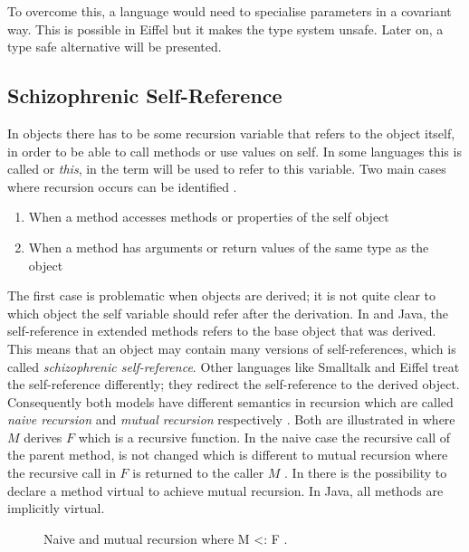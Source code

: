 To overcome this, a language would need to specialise parameters in a
covariant way. This is possible in Eiffel but it makes the type system
unsafe. Later on, a type safe alternative will be presented.

\subsection{Schizophrenic Self-Reference}
\label{sec:schizoReferences}
In objects there has to be some recursion variable that refers to the
object itself, in order to be able to call methods or use values on
self. In some languages this is called \self or \emph{this}, in \ooplss
the term \self will be used to refer to this variable. Two main cases
where recursion occurs can be identified \cite{simons_theory_2003-2}.

\begin{enumerate}
	\item When a method accesses methods or properties of the self object
	\item When a method has arguments or return values of the same type as the object
\end{enumerate}

The first case is problematic when objects are derived; it is not
quite clear to which object the self variable should refer after
the derivation. In \cpp and Java, the self-reference in extended
methods refers to the base object that was derived. This means that
an object may contain many versions of self-references, which is
called \emph{schizophrenic self-reference}. Other languages like
Smalltalk and Eiffel treat the self-reference differently; they
redirect the self-reference to the derived object. Consequently
both models have different semantics in recursion which
are called \emph{naive recursion} and \emph{mutual recursion}
respectively \cite{cook_denotational_1989}. Both are illustrated in
 where $M$ derives $F$ which is a recursive
function. In the naive case the recursive call of the parent method, is
not changed which is different to mutual recursion where the recursive
call in $F$ is returned to the caller $M$ \cite{simons_theory_2003-2}. In
\cpp there is the possibility to declare a method virtual to achieve
mutual recursion. In Java, all methods are implicitly virtual.

\begin{figure}[H]
	\centering
	\caption[Naive and mutual recursion where M <: F.]{Naive and mutual recursion where M <: F \cite{cook_denotational_1989}.}
	\label{fig:schizoRecursion}
\end{figure}

